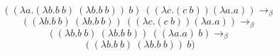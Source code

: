 \documentclass[fleqn]{article}
\begin{document}
\Large
$$((\lambda a.(\lambda b.b\ b)\ (\lambda b.b\ b))\ b)\ ((\lambda c.(c\ b))(\lambda a.a))\to_\beta$$
$$((\lambda b.b\ b)\ (\lambda b.b\ b))\ ((\lambda c.(c\ b))(\lambda a.a))\to_\beta$$
$$((\lambda b.b\ b)\ (\lambda b.b\ b))\ ((\lambda a.a)\ b)\to_\beta$$
$$((\lambda b.b\ b)\ (\lambda b.b\ b))\ b)$$
\end{document}
